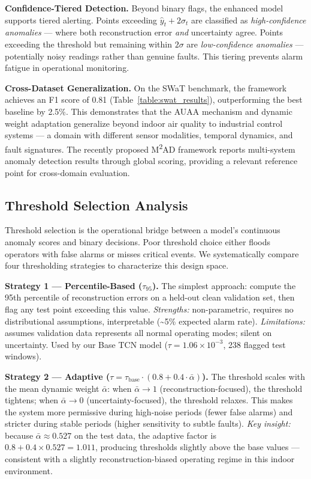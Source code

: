 \textbf{Confidence-Tiered Detection.} Beyond binary flags, the enhanced model supports tiered alerting. Points exceeding $\hat{y}_t + 2\sigma_t$ are classified as \emph{high-confidence anomalies} — where both reconstruction error \emph{and} uncertainty agree. Points exceeding the threshold but remaining within $2\sigma$ are \emph{low-confidence anomalies} — potentially noisy readings rather than genuine faults. This tiering prevents alarm fatigue in operational monitoring.

\textbf{Cross-Dataset Generalization.} On the SWaT benchmark, the framework achieves an F1 score of 0.81 (Table~\ref{table:swat_results}), outperforming the best baseline by 2.5\%. This demonstrates that the AUAA mechanism and dynamic weight adaptation generalize beyond indoor air quality to industrial control systems — a domain with different sensor modalities, temporal dynamics, and fault signatures. The recently proposed M\textsuperscript{2}AD framework \cite{alnegheimish2025m2ad} reports multi-system anomaly detection results through global scoring, providing a relevant reference point for cross-domain evaluation.

\subsection{Threshold Selection Analysis}

Threshold selection is the operational bridge between a model's continuous anomaly scores and binary decisions. Poor threshold choice either floods operators with false alarms or misses critical events. We systematically compare four thresholding strategies to characterize this design space.



\textbf{Strategy 1 — Percentile-Based ($\tau_{95}$).} The simplest approach: compute the 95th percentile of reconstruction errors on a held-out clean validation set, then flag any test point exceeding this value. \emph{Strengths:} non-parametric, requires no distributional assumptions, interpretable (\textasciitilde5\% expected alarm rate). \emph{Limitations:} assumes validation data represents all normal operating modes; silent on uncertainty. Used by our Base TCN model ($\tau = 1.06\times 10^{-3}$, 238 flagged test windows).

\textbf{Strategy 2 — Adaptive ($\tau = \tau_{\text{base}} \cdot (0.8 + 0.4 \cdot \bar{\alpha})$).} The threshold scales with the mean dynamic weight $\bar{\alpha}$: when $\bar{\alpha} \to 1$ (reconstruction-focused), the threshold tightens; when $\bar{\alpha} \to 0$ (uncertainty-focused), the threshold relaxes. This makes the system more permissive during high-noise periods (fewer false alarms) and stricter during stable periods (higher sensitivity to subtle faults). \emph{Key insight:} because $\bar{\alpha} \approx 0.527$ on the test data, the adaptive factor is $0.8 + 0.4 \times 0.527 = 1.011$, producing thresholds slightly above the base values --- consistent with a slightly reconstruction-biased operating regime in this indoor environment.

